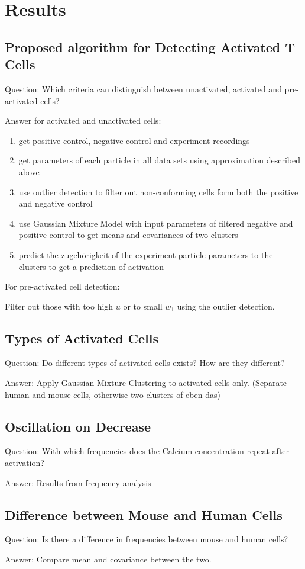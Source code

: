 \chapter{Results}
\label{chapter:results}

\section{Proposed algorithm for Detecting Activated T Cells}

Question: Which criteria can distinguish between unactivated, activated and pre-activated cells?

Answer for activated and unactivated cells:

\begin{enumerate}
	\item get positive control, negative control and experiment recordings
	\item get parameters of each particle in all data sets using approximation described above
	\item use outlier detection to filter out non-conforming cells form both the positive and negative control
	\item use Gaussian Mixture Model with input parameters of filtered negative and positive control to get means and covariances of two clusters
	\item predict the zugehörigkeit of the experiment particle parameters to the clusters to get a prediction of activation
\end{enumerate}

For pre-activated cell detection:

Filter out those with too high $u$ or to small $w_1$ using the outlier detection.

\section{Types of Activated Cells}

Question: Do different types of activated cells exists? How are they different?

Answer: Apply Gaussian Mixture Clustering to activated cells only. (Separate human and mouse cells, otherwise two clusters of eben das)

\section{Oscillation on Decrease}

Question: With which frequencies does the Calcium concentration repeat after activation?

Answer: Results from frequency analysis

\section{Difference between Mouse and Human Cells}

Question: Is there a difference in frequencies between mouse and human cells?

Answer: Compare mean and covariance between the two.